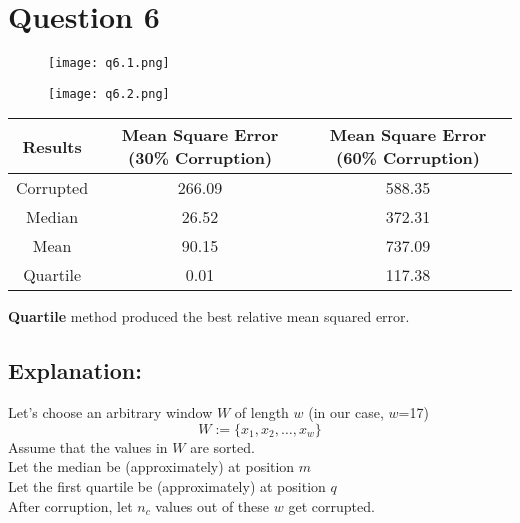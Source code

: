 \documentclass[11pt]{article}
\begin{document}
\section*{Question 6}
\begin{figure}[H]
    \centering
    \texttt{[image: q6.1.png]}
\end{figure}
\begin{figure}[H]
    \centering
    \texttt{[image: q6.2.png]}
\end{figure}
\begin{center}
    \begin{tabular}{|c|c|c|}
        \hline
        \textbf{Results} & \textbf{Mean Square Error (30\% Corruption)} & \textbf{Mean Square Error (60\% Corruption)} \\
        \hline
        Corrupted        & 266.09                                       & 588.35                                       \\
        \hline
        Median           & 26.52                                        & 372.31                                       \\
        \hline
        Mean             & 90.15                                        & 737.09                                       \\
        \hline
        Quartile         & 0.01                                         & 117.38                                       \\
        \hline
    \end{tabular}
\end{center}
\noindent
\textbf{Quartile} method produced the best relative mean squared error.
\subsection*{Explanation:}
Let's choose an arbitrary window $W$ of length $w$ (in our case, $w$=17)
$$ W := \{ x_1, x_2, \ldots, x_w \} $$
Assume that the values in $W$ are sorted.\\
Let the median be (approximately) at position $m$\\
Let the first quartile be (approximately) at position $q$\\
After corruption, let $n_c$ values out of these $w$ get corrupted.
\end{document}
